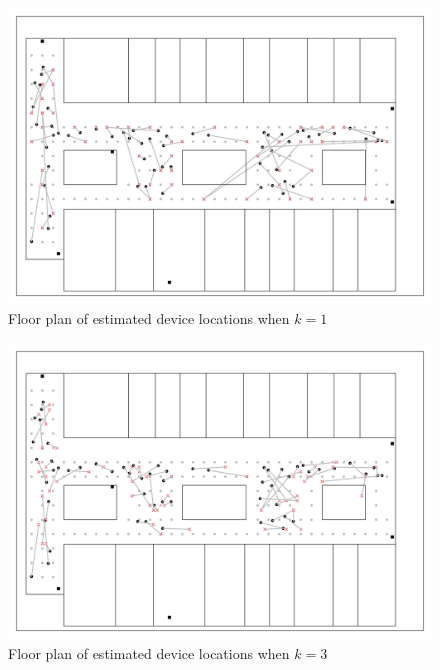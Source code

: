\documentclass[12pt, conference]{IEEEtran}
\begin{document}
\begin{figure}[htbp]
  \centerline{\includegraphics[width=\columnwidth]{img/Plot-K1FloorPlan-1.png}}
  \caption{Floor plan of estimated device locations when $k=1$}
  \label{fig: K1}
\end{figure}

\begin{figure}[htbp]
  \centerline{\includegraphics[width=\columnwidth]{img/Plot-K3FloorPlan-1.png}}
  \caption{Floor plan of estimated device locations when $k=3$}
  \label{fig: K3}
\end{figure}
\end{document}
